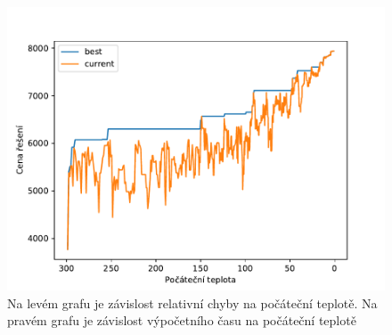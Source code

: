 \documentclass[11pt]{article}
\begin{document}
\begin{figure}
\begin{minipage}[c]{0.49\textwidth}
        \centering \includegraphics[width=\textwidth]{img/T300.pdf} 
    \end{minipage}
   \caption{Na levém grafu je závislost relativní chyby na počáteční teplotě. Na pravém grafu je závislost výpočetního času na počáteční teplotě}\label{fig:GVI}
\end{figure} 
\end{document}
